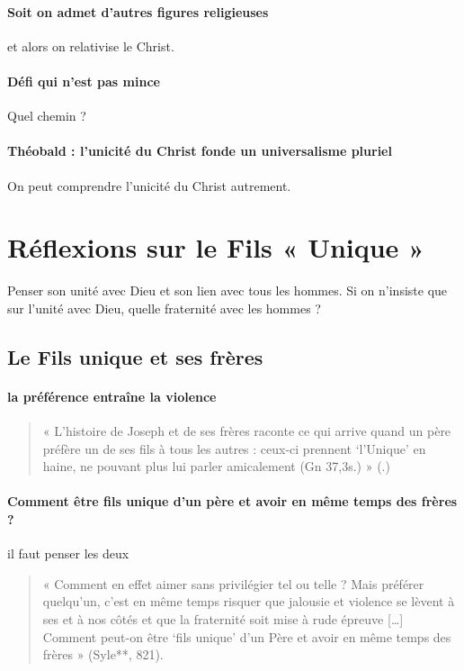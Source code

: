\paragraph{Soit on admet d'autres figures religieuses } et alors on relativise le Christ.

\paragraph{Défi qui n'est pas mince} Quel chemin ?

\paragraph{Théobald : l'unicité du Christ fonde un universalisme pluriel} On peut comprendre l'unicité du Christ autrement. 


\section{Réflexions sur le Fils « Unique »}

Penser son unité avec Dieu et son lien avec tous les hommes. Si on n'insiste que sur l'unité avec Dieu, quelle fraternité avec les hommes ?

\subsection{Le Fils unique et ses frères}

\paragraph{la préférence entraîne la violence}

\begin{quote}
   « L’histoire de Joseph et de ses frères raconte ce qui arrive quand un père préfère un de ses fils à tous les autres : ceux-ci prennent ‘l’Unique’ en haine, ne pouvant plus lui parler amicalement (Gn 37,3s.) » (\citep[p. 821]{theobald_christianisme_2007}.) 
\end{quote}
 
\paragraph{Comment être fils unique d'un père et avoir en même temps des frères ?} il faut penser les deux
\begin{quote}
    « Comment en effet aimer sans privilégier tel ou telle ? Mais préférer quelqu’un, c’est en même temps risquer que jalousie et violence se lèvent à ses et à nos côtés et que la fraternité soit mise à rude épreuve  […] Comment peut-on être ‘fils unique’ d’un Père et avoir en même temps des frères » (Syle**, 821).
\end{quote}

